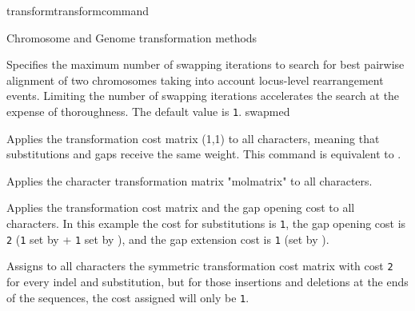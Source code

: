 \begin{command}{transform}{transformcommand}
\begin{arguments}
\begin{argumentgroup}{Chromosome and Genome transformation methods}
\begin{description}
                        {Specifies the maximum number of swapping iterations
                        to search for best pairwise alignment of two chromosomes
                        taking into account locus-level rearrangement events. 
                        Limiting the number of swapping
                        iterations accelerates the search at the expense of
                        thoroughness. The default value is \texttt{1}.}
                        {swapmed}

       
               \end{description}
        \end{argumentgroup}
	\end{arguments}
	


	\begin{poyexamples} 
             	{Applies the transformation cost matrix (1,1) to all characters,
             	meaning that substitutions and gaps receive the same weight. This command
		is equivalent to .}

           	 {Applies the character transformation matrix "molmatrix" to all
            	characters.}
            		
		{Applies the transformation cost matrix and the gap opening cost
		to all characters. In this example the cost for substitutions is \texttt{1},
		the gap opening cost is \texttt{2} (\texttt{1} set by 
		+ \texttt{1} set by ), and the gap extension cost is \texttt{1}
		(set by ).}
		
		{Assigns to all characters the symmetric transformation cost
		matrix with cost \texttt{2} for every indel and substitution, but for those
		insertions and deletions at the ends of the sequences, the cost
		assigned will only be \texttt{1}.}
		

\end{poyexamples}
\end{command}
